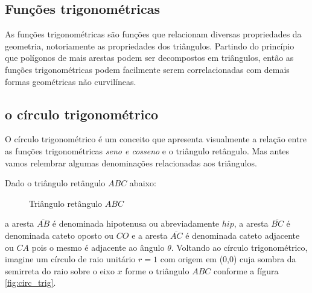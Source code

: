 \begin{multicols*}{2}

    \section*{Funções trigonométricas}
    As funções trigonométricas são funções que relacionam diversas propriedades
    da geometria, notoriamente as propriedades dos triângulos. Partindo do
    princípio que polígonos de mais arestas podem ser decompostos em triângulos,
    então as funções trigonométricas podem facilmente serem correlacionadas com
    demais formas geométricas não curvilíneas.

    \subsection*{o círculo trigonométrico}
    O círculo trigonométrico é um conceito que apresenta visualmente a relação
    entre as funções trigonométricas \textit{seno e cosseno} e o triângulo retângulo.
    Mas antes vamos relembrar algumas denominações relacionadas aos triângulos.

    Dado o triângulo retângulo $ABC$ abaixo:
    \begin{figure}[H]
        \centering
        \caption{Triângulo retângulo $ABC$}
        \label{fig:tri_abc}
    \end{figure}
    \noindent a aresta $\overline{AB}$ é denominada hipotenusa ou abreviadamente $hip$,
    a aresta $\overline{BC}$ é denominada cateto oposto ou $CO$ e a aresta
    $\overline{AC}$ é denominada cateto adjacente ou $CA$ pois o mesmo é
    adjacente ao ângulo $\theta$. Voltando ao círculo trigonométrico, imagine
    um círculo de raio unitário $r=1$ com origem em (0,0) cuja sombra da semirreta do raio sobre o eixo
    $x$ forme o triângulo $ABC$ conforme a fígura \ref{fig:circ_trig}.


\end{multicols*}
